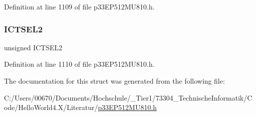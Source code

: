Definition at line 1109 of file p33\+E\+P512\+M\+U810.\+h.

\mbox{\label{structtag_i_c11_c_o_n1_b_i_t_s_a47d80892d449e6edbd5ba2ba9ff06deb}} 
\subsubsection{\texorpdfstring{I\+C\+T\+S\+E\+L2}{ICTSEL2}}
{\footnotesize\ttfamily unsigned I\+C\+T\+S\+E\+L2}



Definition at line 1110 of file p33\+E\+P512\+M\+U810.\+h.



The documentation for this struct was generated from the following file\+:\begin{DoxyCompactItemize}
\item 
C\+:/\+Users/00670/\+Documents/\+Hochschule/\+\_\+\+Tier1/73304\+\_\+\+Technische\+Informatik/\+Code/\+Hello\+World4.\+X/\+Literatur/\hyperlink{p33_e_p512_m_u810_8h}{p33\+E\+P512\+M\+U810.\+h}\end{DoxyCompactItemize}
